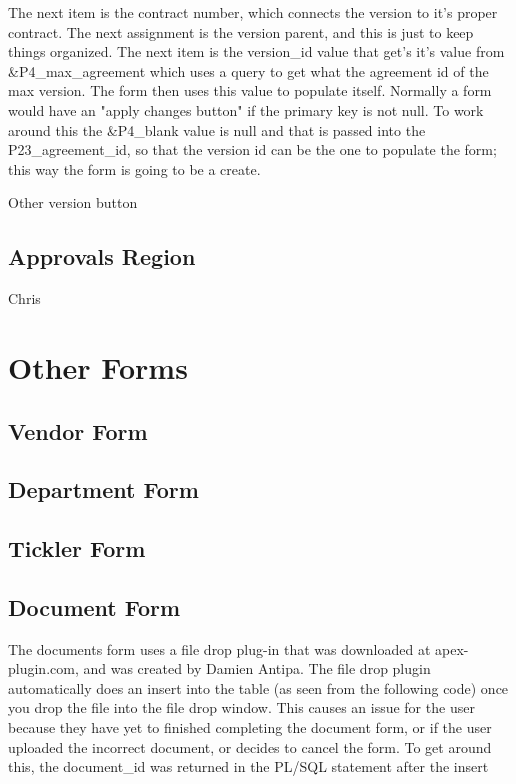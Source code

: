 \documentclass{report}
\begin{document}
The next item is the contract number, which connects the version to it's proper contract. The next assignment is the version parent, and this is just to keep things organized. The next item is the version\_id value that get's it's value from \&P4\_max\_agreement which uses a query to get what the agreement id of the max version. The form then uses this value to populate itself. Normally a form would have an "apply changes button" if the primary key is not null. To work around this the \&P4\_blank value is null and that is passed into the P23\_agreement\_id, so that the version id can be the one to populate the form; this way the form is going to be a create. 

Other version button

\subsection{Approvals Region}
Chris

\section{Other Forms}

\subsection{Vendor Form}

\subsection{Department Form}

\subsection{Tickler Form}

\subsection{Document Form}
The documents form uses a file drop plug-in that was downloaded at apex-plugin.com, and was created by Damien Antipa. The file drop plugin automatically does an insert into the table (as seen from the following code) once you drop the file into the file drop window. This causes an issue for the user because they have yet to finished completing the document form, or if the user uploaded the incorrect document, or decides to cancel the form. To get around this, the document\_id was returned in the PL/SQL statement after the insert
\end{document}
